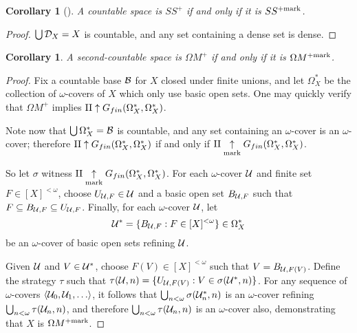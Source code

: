 \documentclass{amsart}
\theoremstyle{plain}
\newtheorem{corollary}[theorem]{Corollary}
\theoremstyle{definition}
\theoremstyle{remark}
\theoremstyle{plain}
\theoremstyle{definition}
\theoremstyle{remark}
\begin{document}
\begin{corollary}[\cite{MR2868880}]
  A countable space is \(SS^+\) if and only if it is
  \(SS^{+\mathrm{mark}}\).
\end{corollary}

\begin{proof}
  \(\bigcup\mathcal{D}_X=X\) is countable, and any set containing a dense
  set is dense.
\end{proof}

\begin{corollary}
  A second-countable space is \(\Omega M^+\) if and only if
  it is \(\Omega M^{+\mathrm{mark}}\).
\end{corollary}

\begin{proof}
  Fix a countable base \(\mathcal{B}\) for \(X\) closed under finite unions, and let
  \(\Omega_X^*\) be the collection of \(\omega\)-covers of \(X\) which only
  use basic open sets.
  One may quickly verify that
  \(\Omega M^+\) implies
  \(\mathrm{II}\uparrow G_{fin}(\Omega_X^*,\Omega_X^*)\).

  Note now that
  \(\bigcup\Omega_X^*=\mathcal{B}\) is countable, and any set containing an
  \(\omega\)-cover is an \(\omega\)-cover; therefore
  \(\mathrm{II}\uparrow G_{fin}(\Omega_X^*,\Omega_X^*)\) if and only if
  \(\mathrm{II}\underset{\text{mark}}{\uparrow}G_{fin}(\Omega_X^*,\Omega_X^*)\).

  So let \(\sigma\) witness
  \(\mathrm{II}\underset{\text{mark}}{\uparrow}G_{fin}(\Omega_X^*,\Omega_X^*)\).
  For each \(\omega\)-cover \(\mathcal{U}\) and finite set \(F\in[X]^{<\omega}\),
  choose \(U_{\mathcal{U},F}\in\mathcal{U}\) and a basic open set \(B_{\mathcal{U},F}\)
  such that \(F\subseteq B_{\mathcal{U},F}\subseteq U_{\mathcal{U},F}\).
  Finally, for each \(\omega\)-cover \(\mathcal{U}\), let
  \[
    \mathcal{U}^*
      =
    \{
      B_{\mathcal{U},F}
        :
      F\in[X]^{<\omega}
    \}
      \in
    \Omega_X^*
  \]
  be an \(\omega\)-cover of basic open sets refining \(\mathcal{U}\).

  Given \(\mathcal{U}\) and \(V\in\mathcal{U}^*\), choose
  \(F(V)\in[X]^{<\omega}\) such that \(V=B_{\mathcal{U},F(V)}\).
  Define the strategy \(\tau\) such that
  \(\tau(\mathcal{U},n)=\{U_{\mathcal{U},F(V)}:V\in\sigma(\mathcal{U}^*,n)\}\).
  For any sequence of \(\omega\)-covers \(\<\mc U_0,\mc U_1,\dots\>\),
  it follows that \(\bigcup_{n<\omega}\sigma(\mathcal{U}_n^*,n)\) is an
  \(\omega\)-cover refining \(\bigcup_{n<\omega}\tau(\mathcal{U}_n,n)\), and therefore
  \(\bigcup_{n<\omega}\tau(\mathcal{U}_n,n)\) is an \(\omega\)-cover also,
  demonstrating that \(X\) is \(\Omega M^{+\mathrm{mark}}\).
\end{proof}
\end{document}
